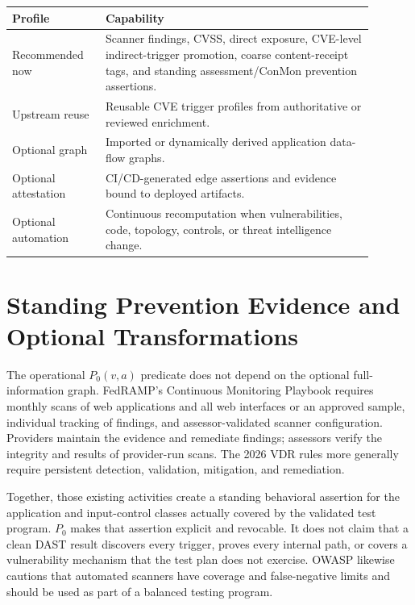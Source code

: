 \documentclass[11pt]{article}
\begin{document}
\begin{center}
\renewcommand{\arraystretch}{1.08}
\footnotesize
\begin{tabular}{p{0.23\linewidth}p{0.66\linewidth}}
\toprule
\textbf{Profile} & \textbf{Capability} \\
\midrule
Recommended now & Scanner findings, CVSS, direct exposure, CVE-level
indirect-trigger promotion,
coarse content-receipt tags, and standing assessment/ConMon prevention
assertions. \\
Upstream reuse & Reusable CVE trigger profiles from authoritative or reviewed
enrichment. \\
Optional graph & Imported or dynamically derived application data-flow graphs. \\
Optional attestation & CI/CD-generated edge assertions and evidence bound to
deployed artifacts. \\
Optional automation & Continuous recomputation when vulnerabilities, code,
topology, controls, or
threat intelligence change. \\
\bottomrule
\end{tabular}
\end{center}

\section{Standing Prevention Evidence and Optional Transformations}
\label{sec:sanitization}
The operational $P_0(v,a)$ predicate does not depend on the optional
full-information graph. FedRAMP's Continuous Monitoring Playbook requires monthly scans
of web applications and all web interfaces or an approved sample, individual
tracking of findings, and assessor-validated scanner configuration. Providers
maintain the evidence and remediate findings; assessors verify the integrity
and results of provider-run scans. The 2026 VDR rules more generally require
persistent detection, validation, mitigation, and remediation.
\cite{fedramp-vdr,fedramp-conmon}

Together, those existing activities create a standing behavioral assertion for
the application and input-control classes actually covered by the validated
test program. $P_0$ makes that assertion explicit and revocable. It does not
claim that a clean DAST result discovers every trigger, proves every internal
path, or covers a vulnerability mechanism that the test plan does not exercise.
OWASP likewise cautions that automated scanners have coverage and false-negative
limits and should be used as part of a balanced testing program.
\cite{owasp-wstg}
\end{document}
